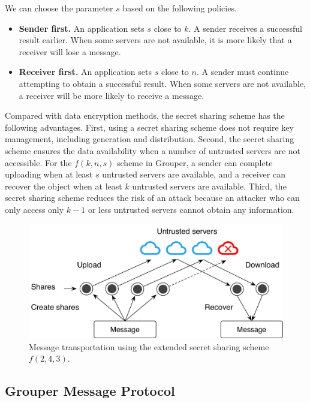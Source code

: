 \documentclass[sigconf]{acmart}
\begin{document}
We can choose the parameter $s$ based on the following policies.

\begin{itemize}
	\setlength{\itemsep}{1pt}
	\setlength{\parskip}{0pt}
	\setlength{\parsep}{0pt}
	\item \textbf{Sender first.} 
	An application sets $s$ close to $k$. 
	A sender receives a successful result earlier.
	When some servers are not available, it is more likely that a receiver will lose a message.
	\item \textbf{Receiver first.}
	An application sets $s$ close to $n$. 
	A sender must continue attempting to obtain a successful result.
	When some servers are not available, a receiver will be more likely to receive a message.
\end{itemize}

Compared with data encryption methods, the secret sharing scheme has the following advantages.
First, using a secret sharing scheme does not require key management, including generation and distribution.
Second, the secret sharing scheme ensures the data availability when a number of untrusted servers are not accessible.
For the $f(k, n, s)$ scheme in Grouper, a sender can complete uploading when at least $s$ untrusted servers are available, and a receiver can recover the object when at least $k$ untrusted servers are available.
Third, the secret sharing scheme reduces the risk of an attack because an attacker who can only access only $k-1$ or less untrusted servers cannot obtain any information.

\begin{figure}[t]
	\centering
	\includegraphics[scale=0.40]{transportation}
	\caption{Message transportation using the extended secret sharing scheme $f(2, 4, 3)$.}
\end{figure}

\subsection{Grouper Message Protocol}
\end{document}
